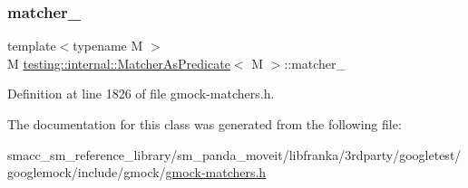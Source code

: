\subsubsection{\texorpdfstring{matcher\+\_\+}{matcher\_}}
{\footnotesize\ttfamily template$<$typename M $>$ \\
M \hyperlink{classtesting_1_1internal_1_1MatcherAsPredicate}{testing\+::internal\+::\+Matcher\+As\+Predicate}$<$ M $>$\+::matcher\+\_\+\hspace{0.3cm}{\ttfamily [private]}}



Definition at line 1826 of file gmock-\/matchers.\+h.



The documentation for this class was generated from the following file\+:\begin{DoxyCompactItemize}
\item 
smacc\+\_\+sm\+\_\+reference\+\_\+library/sm\+\_\+panda\+\_\+moveit/libfranka/3rdparty/googletest/googlemock/include/gmock/\hyperlink{gmock-matchers_8h}{gmock-\/matchers.\+h}\end{DoxyCompactItemize}
